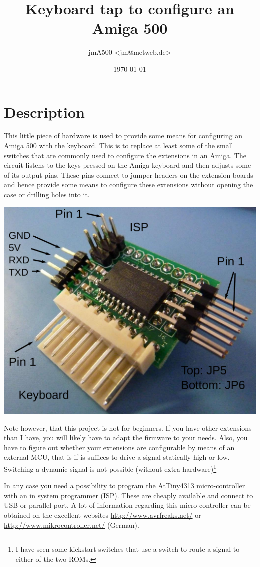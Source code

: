 \documentclass[DIV10]{scrartcl}
\author{jmA500 <jm@metweb.de>}
\date{\today}
\title{Keyboard tap to configure an Amiga 500}
\begin{document}
\maketitle
\section{Description}
This little piece of hardware is used to provide some means for
configuring an Amiga 500 with the keyboard. This is to replace at
least some of the small switches that are commonly used to configure
the extensions in an Amiga. The circuit listens to the keys pressed
on the Amiga keyboard and then adjusts some of its output pins. These
pins connect to jumper headers on the extension boards and hence provide some
means to configure these extensions without opening the case or
drilling holes into it.
\begin{center}
  \includegraphics[width=.7\linewidth]{config-annot}
\end{center}
Note however, that this project is not for beginners. If you have
other extensions than I have, you will likely have to adapt the
firmware to your needs. Also, you have to figure out whether your
extensions are configurable by means of an external MCU, that is if is
suffices to drive a signal statically high or low. Switching a dynamic
signal is not possible (without extra hardware)\footnote{I have seen
  some kickstart switches that use a switch to route a signal to
  either of the two ROMs.} 

In any case you need a possibility to program the AtTiny4313
micro-controller with an in system programmer (ISP). These are cheaply
available and connect to USB or parallel port. A lot of information
regarding this micro-controller can be obtained on the
excellent websites \url{http://www.avrfreaks.net/} or
\url{http://www.mikrocontroller.net/} (German).
\end{document}
